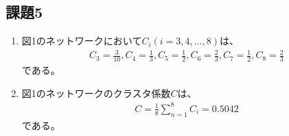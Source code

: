 \documentclass[12pt]{jarticle}
\begin{document}
\clearpage
\subsection{課題5}
\begin{enumerate}
    \item 図1のネットワークにおいて$C_i(i=3,4,...,8)$は、
          \begin{eqnarray*}
              C_3=\frac{3}{10}, C_4=\frac{1}{3}, C_5=\frac{1}{2}, C_6=\frac{2}{3}, C_7=\frac{1}{2}, C_8=\frac{2}{3}
          \end{eqnarray*}
          である。
    \item 図1のネットワークのクラスタ係数$C$は、
          \begin{eqnarray*}
              C=\frac{1}{8} \sum_{n = 1}^{8} C_i =0.5042
          \end{eqnarray*}
          である。
\end{enumerate}
\end{document}
